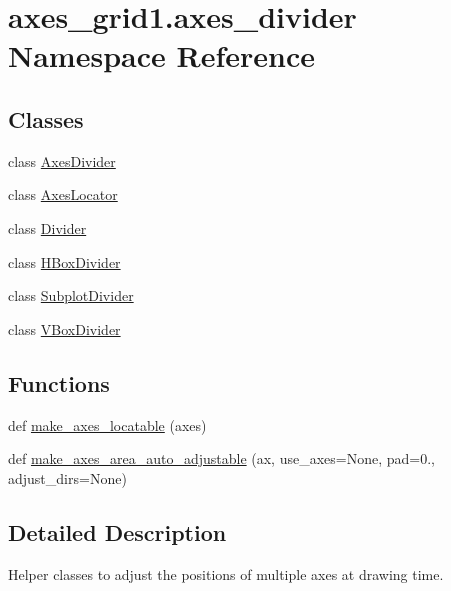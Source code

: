 \hypertarget{namespaceaxes__grid1_1_1axes__divider}{}\section{axes\+\_\+grid1.\+axes\+\_\+divider Namespace Reference}
\label{namespaceaxes__grid1_1_1axes__divider}
\subsection*{Classes}
\begin{DoxyCompactItemize}
\item 
class \hyperlink{classaxes__grid1_1_1axes__divider_1_1AxesDivider}{Axes\+Divider}
\item 
class \hyperlink{classaxes__grid1_1_1axes__divider_1_1AxesLocator}{Axes\+Locator}
\item 
class \hyperlink{classaxes__grid1_1_1axes__divider_1_1Divider}{Divider}
\item 
class \hyperlink{classaxes__grid1_1_1axes__divider_1_1HBoxDivider}{H\+Box\+Divider}
\item 
class \hyperlink{classaxes__grid1_1_1axes__divider_1_1SubplotDivider}{Subplot\+Divider}
\item 
class \hyperlink{classaxes__grid1_1_1axes__divider_1_1VBoxDivider}{V\+Box\+Divider}
\end{DoxyCompactItemize}
\subsection*{Functions}
\begin{DoxyCompactItemize}
\item 
def \hyperlink{namespaceaxes__grid1_1_1axes__divider_acfe371db892d9d386c36fa252152a7c9}{make\+\_\+axes\+\_\+locatable} (axes)
\item 
def \hyperlink{namespaceaxes__grid1_1_1axes__divider_a5b2ed3d1d01ad13b84dd945ea2e86f78}{make\+\_\+axes\+\_\+area\+\_\+auto\+\_\+adjustable} (ax, use\+\_\+axes=None, pad=0., adjust\+\_\+dirs=None)
\end{DoxyCompactItemize}


\subsection{Detailed Description}
\begin{DoxyVerb}Helper classes to adjust the positions of multiple axes at drawing time.
\end{DoxyVerb}
 

